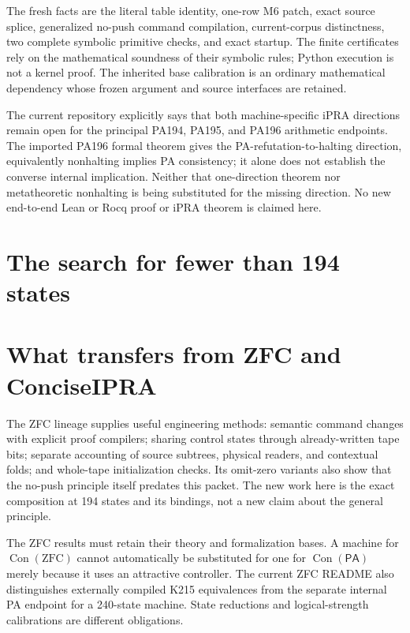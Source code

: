 \documentclass[10pt,letterpaper]{article}
\newcommand{\PA}{\mathsf{PA}}
\newcommand{\Con}{\operatorname{Con}}
\begin{document}
The fresh facts are the literal table identity, one-row M6 patch, exact
source splice, generalized no-push command compilation, current-corpus
distinctness, two complete symbolic primitive checks, and exact startup.
The finite certificates rely on the mathematical soundness of their
symbolic rules; Python execution is not a kernel proof. The inherited
base calibration is an ordinary mathematical dependency whose frozen
argument and source interfaces are retained.

The current repository explicitly says that both machine-specific iPRA
directions remain open for the principal PA194, PA195, and PA196 arithmetic
endpoints\cite{pareadme}. The imported PA196 formal theorem gives the
PA-refutation-to-halting direction, equivalently nonhalting implies PA
consistency; it alone does not establish the converse internal implication.
Neither that one-direction theorem nor metatheoretic nonhalting is being
substituted for the missing direction. No new end-to-end Lean or Rocq proof
or iPRA theorem is claimed here.

\section{The search for fewer than 194 states}
\label{sec:search}



\section{What transfers from ZFC and ConciseIPRA}
\label{sec:transfer}

The ZFC lineage supplies useful engineering methods: semantic command
changes with explicit proof compilers; sharing control states through
already-written tape bits; separate accounting of source subtrees,
physical readers, and contextual folds; and whole-tape initialization
checks. Its omit-zero variants also show that the no-push principle itself
predates this packet\cite{zfc}. The new work here is the exact composition
at 194 states and its bindings, not a new claim about the general principle.

The ZFC results must retain their theory and formalization bases. A machine
for $\Con(\mathrm{ZFC})$ cannot automatically be substituted for one for
$\Con(\PA)$ merely because it uses an attractive controller. The current
ZFC README also distinguishes externally compiled K215 equivalences from
the separate internal PA endpoint for a 240-state machine. State reductions
and logical-strength calibrations are different obligations.
\end{document}
